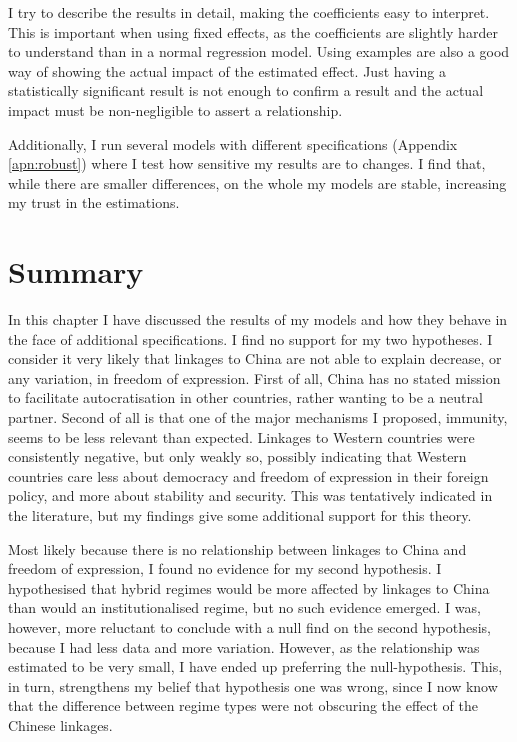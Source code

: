 I try to describe the results in detail, making the coefficients easy to interpret. This is important when using fixed effects, as the coefficients are slightly harder to understand than in a normal regression model. Using examples are also a good way of showing the actual impact of the estimated effect. Just having a statistically significant result is not enough to confirm a result and the actual impact must be non-negligible to assert a relationship. 

Additionally, I run several models with different specifications (Appendix \ref{apn:robust}) where I test how sensitive my results are to changes. I find that, while there are smaller differences, on the whole my models are stable, increasing my trust in the estimations. 

\section{Summary}
In this chapter I have discussed the results of my models and how they behave in the face of additional specifications. I find no support for my two hypotheses. I consider it very likely that linkages to China are not able to explain decrease, or any variation, in freedom of expression. First of all, China has no stated mission to facilitate autocratisation in other countries, rather wanting to be a neutral partner. Second of all is that one of the major mechanisms I proposed, immunity, seems to be less relevant than expected. Linkages to Western countries were consistently negative, but only weakly so, possibly indicating that Western countries care less about democracy and freedom of expression in their foreign policy, and more about stability and security. This was tentatively indicated in the literature, but my findings give some additional support for this theory.

Most likely because there is no relationship between linkages to China and freedom of expression, I found no evidence for my second hypothesis. I hypothesised that hybrid regimes would be more affected by linkages to China than would an institutionalised regime, but no such evidence emerged. I was, however, more reluctant to conclude with a null find on the second hypothesis, because I had less data and more variation. However, as the relationship was estimated to be very small, I have ended up preferring the null-hypothesis. This, in turn, strengthens my belief that hypothesis one was wrong, since I now know that the difference between regime types were not obscuring the effect of the Chinese linkages.